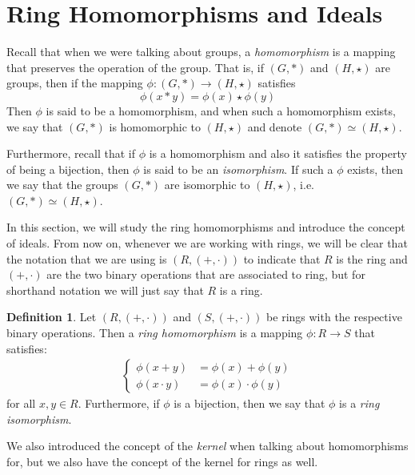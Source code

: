 \documentclass[11pt]{book}
\theoremstyle{definition}\newtheorem{definition}[subsection]{Definition}
\theoremstyle{definition}\newtheorem{example}[subsection]{Example}
\theoremstyle{definition}\newtheorem{notation}[subsection]{Notation}
\theoremstyle{definition}\newtheorem{remark}[subsection]{Remark}
\theoremstyle{theorem}\newtheorem{theorem}[subsection]{Theorem}
\theoremstyle{theorem}\newtheorem{lemma}[subsection]{Lemma}
\theoremstyle{theorem}\newtheorem{proposition}[subsection]{Proposition}
\theoremstyle{theorem}\newtheorem{corollary}[subsection]{Corollary}
\begin{document}
\section{Ring Homomorphisms and Ideals}

Recall that when we were talking about groups, a \emph{homomorphism} is a mapping that preserves the operation of the group. That is, if $(G, *)$ and $(H, \star)$ are groups, then if the mapping $\phi : (G, *) \to (H, \star)$ satisfies
\begin{equation*}
    \phi(x * y) = \phi(x) \star \phi(y)
\end{equation*}
Then $\phi$ is said to be a homomorphism, and when such a homomorphism exists, we say that $(G, *)$ is homomorphic to $(H, \star)$ and denote $(G, *) \simeq (H, \star)$.  

Furthermore, recall that if $\phi$ is a homomorphism and also it satisfies the property of being a bijection, then $\phi$ is said to be an \emph{isomorphism}. If such a $\phi$ exists, then we say that the groups $(G, *)$ are isomorphic to $(H, \star)$, i.e. $(G, *) \simeq (H, \star)$.  

In this section, we will study the ring homomorphisms and introduce the concept of ideals. From now on, whenever we are working with rings, we will be clear that the notation that we are using is $(R, (+, \cdot))$ to indicate that $R$ is the ring and $(+, \cdot)$ are the two binary operations that are associated to ring, but for shorthand notation we will just say that $R$ is a ring.

\begin{definition}\label{definition:1.3.1}
    Let $(R, (+, \cdot))$ and $(S, (+, \cdot))$ be rings with the respective binary operations. Then a \emph{ring homomorphism} is a mapping $\phi : R \to S$ that satisfies:
    \begin{align*}
        \begin{cases}
            \phi(x + y) &= \phi(x) + \phi(y) \\
            \phi(x \cdot y) &= \phi(x) \cdot \phi(y)
        \end{cases}
    \end{align*}
    for all $x, y \in R$. Furthermore, if $\phi$ is a bijection, then we say that $\phi$ is a \emph{ring isomorphism}.
\end{definition}

We also introduced the concept of the \emph{kernel} when talking about homomorphisms for, but we also have the concept of the kernel for rings as well.
\end{document}
